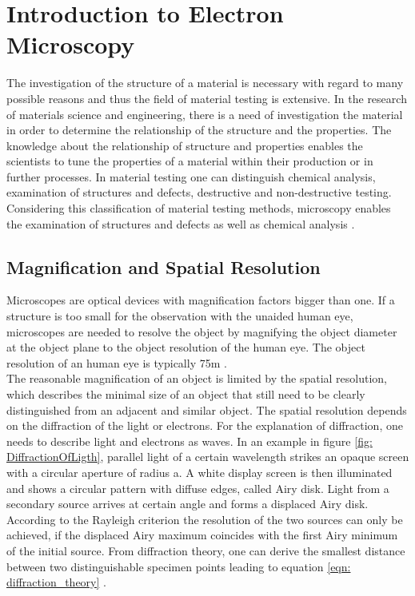 \section{Introduction to Electron Microscopy}
\label{sec: introduction}

The investigation of the structure of a material is necessary with regard to many possible reasons and thus the field of material testing is extensive. In the research of materials science and engineering, there is a need of investigation the material in order to determine the relationship of the structure and the properties. The knowledge about the relationship of structure and properties enables the scientists to tune the properties of a material within their production or in further processes. In material testing one can distinguish chemical analysis, examination of structures and defects, destructive and non-destructive testing. Considering this classification of material testing methods, microscopy enables the examination of structures and defects as well as chemical analysis \cite[p.497]{Weißbach_Dahms_Jaroschek_2015}.

\subsection{Magnification and Spatial Resolution}

Microscopes are optical devices with magnification factors bigger than one. If a structure is too small for the observation with the unaided human eye, microscopes are needed to resolve the object by magnifying the object diameter at the object plane to the object resolution of the human eye. The object resolution of an human eye is typically 75\textmu m \cite[p.5]{EGERTON_2016}.\\

The reasonable magnification of an object is limited by the spatial resolution, which describes the minimal size of an object that still need to be clearly distinguished from an adjacent and similar object. The spatial resolution depends on the diffraction of the light or electrons. For the explanation of diffraction, one needs to describe light and electrons as waves. In an example in figure \ref{fig: DiffractionOfLigth}, parallel light of a certain wavelength \textlambda{} strikes an opaque screen with a circular aperture of radius a. A white display screen is then illuminated and shows a circular pattern with diffuse edges, called Airy disk. Light from a secondary source arrives at certain angle \straighttheta{} and forms a displaced Airy disk. According to the Rayleigh criterion the resolution of the two sources can only be achieved, if the displaced Airy maximum coincides with the first Airy minimum of the initial source. From diffraction theory, one can derive the smallest distance between two distinguishable specimen points leading to equation \ref{eqn: diffraction_theory} \cite[p.3]{EGERTON_2016}.

